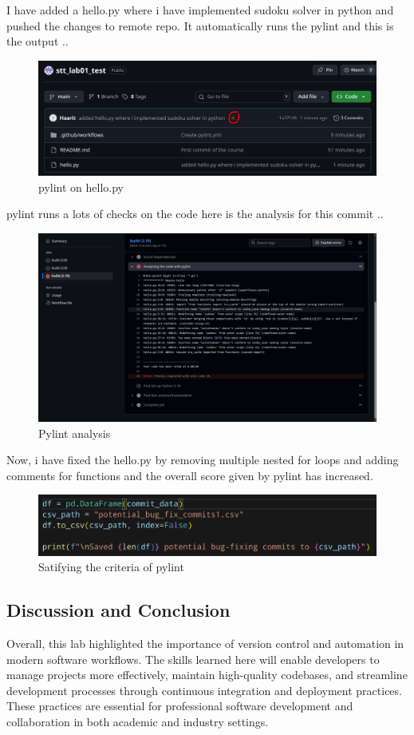\documentclass[a4paper,12pt,twoside,english]{all-in-one} %
\begin{document}
I have added a hello.py where i have implemented sudoku solver in python and pushed the changes to remote repo. It automatically runs the pylint and this is the output ..
\begin{figure}[H]
    \centering
    \includegraphics[width=0.75\linewidth]{image16.png}
    \caption{pylint on hello.py}
    \label{fig:placeholder}
\end{figure}

pylint runs a lots of checks on the code here is the analysis for this commit ..
\begin{figure}[H]
    \centering
    \includegraphics[width=0.75\linewidth]{image17.png}
    \caption{Pylint analysis}
    \label{fig:placeholder}
\end{figure}

Now, i have fixed the hello.py by removing multiple nested for loops and adding comments for functions and the overall score given by pylint has increased.

\begin{figure}[H]
    \centering
    \includegraphics[width=0.75\linewidth]{image.png}
    \caption{Satifying the criteria of pylint}
    \label{fig:placeholder}
\end{figure}



\subsection{Discussion and Conclusion}
Overall, this lab highlighted the importance of version control and automation in modern software workflows. The skills learned here will enable developers to manage projects more effectively, maintain high-quality codebases, and streamline development processes through continuous integration and deployment practices. These practices are essential for professional software development and collaboration in both academic and industry settings.
\end{document}
